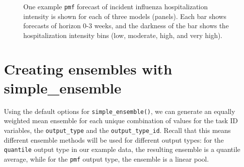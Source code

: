 \documentclass[
  article,
  shortnames,
  notitle]{jss}
\begin{document}
\begin{longtable}[]
\caption{\label{tbl-example-forecasts-pmf}Example \texttt{pmf} model
output for forecasts of incident influenza hospitalization intensity. A
subset of example model output is shown: 1-week ahead pmf forecasts made
on 2022-12-17 for the US from three distinct models. We round the
forecasted probability (in the \texttt{value} column) to two digits. The
\texttt{location} and \texttt{target\_end\_date} columns have been
omitted for brevity. This example data is provided in the
\texttt{hubEnsembles} package and is a subset of the
\texttt{example-complex-forecast-hub} data provided by the hubverse
\citep{hubverse_docs}.}

\tabularnewline
\end{longtable}

\begin{figure}


\caption{\label{fig-plot-ex-mods-pmf}One example \texttt{pmf} forecast
of incident influenza hospitalization intensity is shown for each of
three models (panels). Each bar shows forecasts of horizon 0-3 weeks,
and the darkness of the bar shows the hospitalization intensity bins
(low, moderate, high, and very high).}

\end{figure}%

\section{Creating ensembles with
simple\_ensemble}\label{creating-ensembles-with-simple_ensemble}

Using the default options for \texttt{simple\_ensemble()}, we can
generate an equally weighted mean ensemble for each unique combination
of values for the task ID variables, the \texttt{output\_type} and the
\texttt{output\_type\_id}. Recall that this means different ensemble
methods will be used for different output types: for the
\texttt{quantile} output type in our example data, the resulting
ensemble is a quantile average, while for the \texttt{pmf} output type,
the ensemble is a linear pool.
\end{document}
